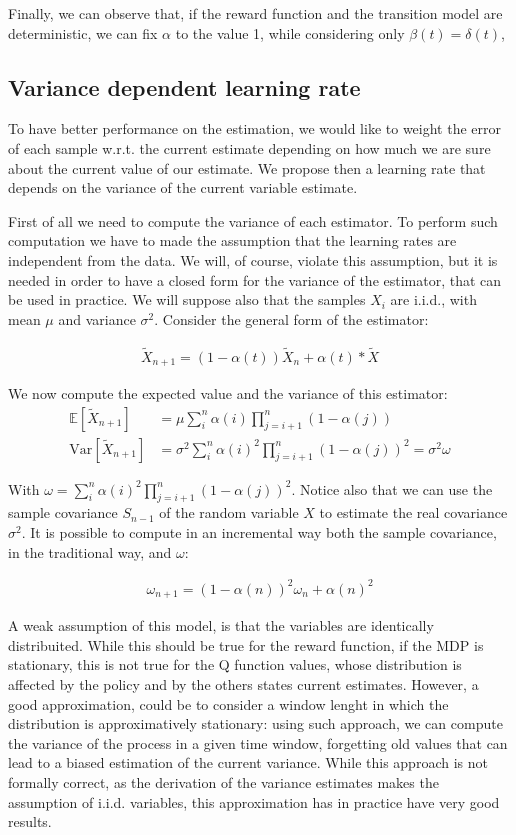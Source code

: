 \documentclass[conference]{IEEEtran}
\begin{document}
Finally, we can observe that, if the reward function and the transition model are deterministic, we can fix $\alpha$ to the value 1, while considering only $\beta(t)=\delta(t)$,

\subsection{Variance dependent learning rate}
To have better performance on the estimation, we would like to weight the error of each sample w.r.t. the current estimate depending on how much we are sure about the current value of our estimate. We propose then a learning rate that depends on the variance of the current variable estimate.

First of all we need to compute the variance of each estimator. To perform such computation we have to made the assumption that the learning rates are independent from the data. We will, of course, violate this assumption, but it is needed in order to have a closed form for the variance of the estimator, that can be used in practice. We will suppose also that the samples $X_i$ are i.i.d., with mean $\mu$ and variance $\sigma^2$. Consider the general form of the estimator:

\begin{align}
 \widetilde{X}_{n+1} = (1-\alpha(t))\widetilde{X}_{n}+\alpha(t)*\widetilde{X}
\end{align}

We now compute the expected value and the variance of this estimator:
\begin{align}
 \mathbb{E}\left[\widetilde{X}_{n+1}\right]& = \mu\sum_i^n \alpha(i) \prod_{j=i+1}^{n} \left(1-\alpha(j)\right)\\
 \mathrm{Var}\left[\widetilde{X}_{n+1}\right]& = \sigma^2\sum_i^n \alpha(i)^2 \prod_{j=i+1}^{n} \left(1-\alpha(j)\right)^2 = \sigma^2\omega
\end{align}

With $\omega=\sum_i^n \alpha(i)^2 \prod_{j=i+1}^{n} \left(1-\alpha(j)\right)^2$. Notice also that we can use the sample covariance $S_{n-1}$ of the random variable $X$ to estimate the real covariance $\sigma^2$. It is possible to compute in an incremental way both the sample covariance, in the traditional way, and $\omega$:

\begin{align}
 \omega_{n+1}=(1-\alpha(n))^2\omega_n+\alpha(n)^2
\end{align}

A weak assumption of this model, is that the variables are identically distribuited. While this should be true for the reward function, if the MDP is stationary, this is not true for the Q function values, whose distribution is affected by the policy and by the others states current estimates. However, a good approximation, could be to consider a window lenght in which the distribution is approximatively stationary: using such approach, we can compute the variance of the process in a given time window, forgetting old values that can lead to a biased estimation of the current variance. While this approach is not formally correct, as the derivation of the variance estimates makes the assumption of i.i.d. variables, this approximation has in practice have very good results.
\end{document}

